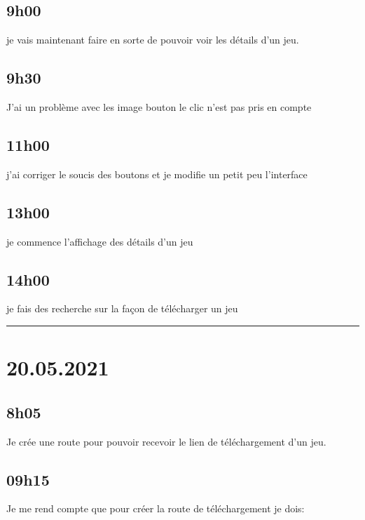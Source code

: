 \documentclass[a4paper,12pt,french]{sphinxmanual}
\begin{document}
\subsection{9h00}
\label{\detokenize{logbook:id131}}
\sphinxAtStartPar
je vais maintenant faire en sorte de pouvoir voir les détails d’un jeu.


\subsection{9h30}
\label{\detokenize{logbook:id132}}
\sphinxAtStartPar
J’ai un problème avec les image bouton le clic n’est pas pris en compte


\subsection{11h00}
\label{\detokenize{logbook:id133}}
\sphinxAtStartPar
j’ai corriger le soucis des boutons et je modifie un petit peu l’interface


\subsection{13h00}
\label{\detokenize{logbook:id134}}
\sphinxAtStartPar
je commence l’affichage des détails d’un jeu


\subsection{14h00}
\label{\detokenize{logbook:id135}}
\sphinxAtStartPar
je fais des recherche sur la façon de télécharger un jeu


\bigskip\hrule\bigskip



\section{20.05.2021}
\label{\detokenize{logbook:id136}}

\subsection{8h05}
\label{\detokenize{logbook:id137}}
\sphinxAtStartPar
Je crée une route pour pouvoir recevoir le lien de téléchargement d’un jeu.


\subsection{09h15}
\label{\detokenize{logbook:id138}}
\sphinxAtStartPar
Je me rend compte que pour créer la route de téléchargement je dois:
\end{document}
